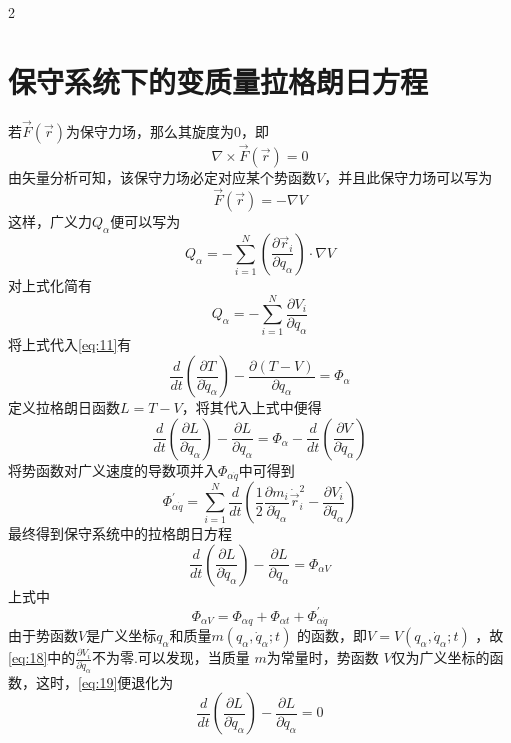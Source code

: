 \documentclass[12pt,twoside]{article}
\numberwithin{equation}{section}    %
\begin{document}
\begin{multicols}{2}
    \section{保守系统下的变质量拉格朗日方程}
    若$\vec{F}\left( \vec{r} \right) $为保守力场，那么其旋度为0，即
    \begin{equation}
        \nabla \times \vec{F}\left( \vec{r} \right) =0
        \label{eq:15}
    \end{equation}
    由矢量分析可知，该保守力场必定对应某个势函数$V$，并且此保守力场可以写为
    \begin{equation}
        \vec{F}\left( \vec{r} \right) =-\nabla V
        \label{eq:16}
    \end{equation}
    这样，广义力$Q_{\alpha}$便可以写为
    \[
        Q_{\alpha}=-\sum_{i=1}^N{\left( \frac{\partial \vec{r}_i}{\partial q_{\alpha}} \right) \cdot \nabla V}
    \]  
    对上式化简有
    \begin{equation}
        Q_{\alpha}=-\sum_{i=1}^N{\frac{\partial V_i}{\partial q_{\alpha}}}
        \label{eq:17}
    \end{equation}
    将上式代入\eqref{eq:11}有
    \[
        \frac{d}{dt}\left( \frac{\partial T}{\partial \dot{q}_{\alpha}} \right) -\frac{\partial \left( T-V \right)}{\partial q_{\alpha}}=\varPhi _{\alpha}
    \]
    定义拉格朗日函数$L=T-V$，将其代入上式中便得
    \[
        \frac{d}{dt}\left( \frac{\partial L}{\partial \dot{q}_{\alpha}} \right) -\frac{\partial L}{\partial q_{\alpha}}=\varPhi _{\alpha}-\frac{d}{dt}\left( \frac{\partial V}{\partial \dot{q}_{\alpha}} \right)
    \]
    将势函数对广义速度的导数项并入$\varPhi _{\alpha \dot{q}}$中可得到
    \begin{equation}
        \varPhi _{\alpha \dot{q}}^{\prime}=\sum_{i=1}^N{\frac{d}{dt}\left( \frac{1}{2}\frac{\partial m_i}{\partial \dot{q}_{\alpha}}\dot{\vec{r}}_{i}^{2}-\frac{\partial V_i}{\partial \dot{q}_{\alpha}} \right)}
        \label{eq:18}
    \end{equation}
    最终得到保守系统中的拉格朗日方程
    \begin{equation}
        \frac{d}{dt}\left( \frac{\partial L}{\partial \dot{q}_{\alpha}} \right) -\frac{\partial L}{\partial q_{\alpha}}=\varPhi _{\alpha V}
        \label{eq:19}
    \end{equation}
    上式中
    \[
        \varPhi _{\alpha V}=\varPhi _{\alpha q}+\varPhi _{\alpha t}+\varPhi _{\alpha \dot{q}}^{\prime}
    \]  
    由于势函数$V$是广义坐标$q_{\alpha}$和质量$m\left( q_{\alpha},\dot{q}_{\alpha};t \right)$ 的函数，即$V=V\left( q_{\alpha},\dot{q}_{\alpha};t \right) $ ，故\eqref{eq:18}中的$\frac{\partial V_i}{\partial \dot{q}_{\alpha}}$不为零.可以发现，当质量 $m$为常量时，势函数 $V$仅为广义坐标的函数，这时，\eqref{eq:19}便退化为
    \begin{equation}
        \frac{d}{dt}\left( \frac{\partial L}{\partial \dot{q}_{\alpha}} \right) -\frac{\partial L}{\partial q_{\alpha}}=0
        \label{eq:20}
    \end{equation}


\end{multicols}
\end{document}
